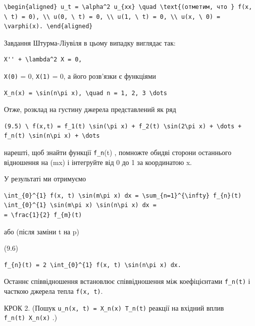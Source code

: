 \documentclass[
  ukrainian,
]{article}
\begin{document}
\begin{verbatim}
\begin{aligned} u_t = \alpha^2 u_{xx} \quad \text{(отметим, что } f(x, \ t) = 0), \\ u(0, \ t) = 0, \\ u(1, \ t) = 0, \\ u(x, \ 0) = \varphi(x). \end{aligned}
\end{verbatim}

Завдання Штурма-Ліувіля в цьому випадку виглядає так:

\begin{verbatim}
X'' + \lambda^2 X = 0,
\end{verbatim}

\texttt{X(0)} = 0, \texttt{X(1)} = 0, а його розв'язки є функціями

\begin{verbatim}
X_n(x) = \sin(n\pi x), \quad n = 1, 2, 3 \dots
\end{verbatim}

Отже, розклад на густину джерела представлений як ряд

\begin{verbatim}
(9.5) \ f(x,t) = f_1(t) \sin(\pi x) + f_2(t) \sin(2\pi x) + \dots + f_n(t) \sin(n\pi x) + \dots
\end{verbatim}

 нарешті, щоб знайти функції \texttt{f\_n}(t) , помножте
обидві сторони останнього відношення на \sin(m\pi x) і інтегруйте від 0
до 1 за координатою x.

У результаті ми отримуємо

\begin{verbatim}
\int_{0}^{1} f(x, t) \sin(m\pi x) dx = \sum_{n=1}^{\infty} f_{n}(t) \int_{0}^{1} \sin(m\pi x) \sin(n\pi x) dx =
= \frac{1}{2} f_{m}(t)
\end{verbatim}

або (після заміни t на p)

(9.6)

\begin{verbatim}
f_{n}(t) = 2 \int_{0}^{1} f(x, t) \sin(n\pi x) dx.
\end{verbatim}

Останнє співвідношення встановлює співвідношення між коефіцієнтами
\texttt{f\_n(t)} і часткою джерела тепла \texttt{f(x,\ t)}.

КРОК 2. (Пошук \texttt{u\_n(x,\ t)\ =\ X\_n(x)\ T\_n(t)} реакції на
вхідний вплив \texttt{f\_n(t)\ X\_n(x)} .)
\end{document}
